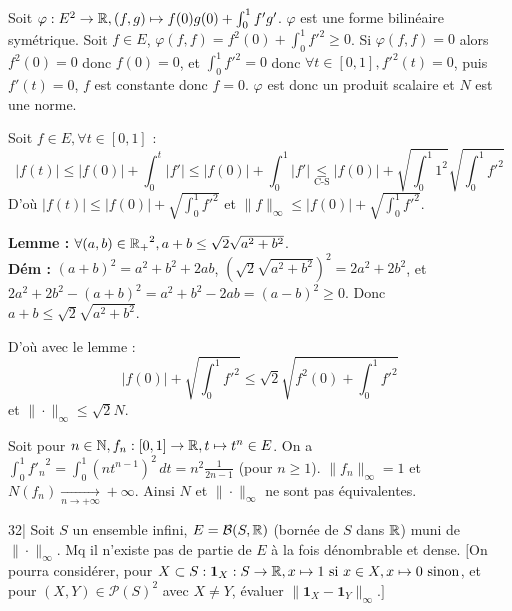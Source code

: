 \begin{solution}
Soit $\varphi : E^2 \to \mathbb R, (f, g) \mapsto f(0)g(0) + \int_0^1 f' g'$. $\varphi$ est une forme bilinéaire symétrique.
Soit $f \in E$, $\varphi(f, f) = f^2(0) + \int_0^1 {f'}^2 \geq 0$.
Si $\varphi(f, f) = 0$ alors $f^2(0) = 0$ donc $f(0) = 0$, et $\int_0^1 {f'}^2 = 0$ donc $\forall t \in [0, 1], {f'}^2(t) = 0$, puis $f'(t) = 0$, $f$ est constante donc $f = 0$.
$\varphi$ est donc un produit scalaire et $N$ est une norme.

Soit $f \in E, \forall t \in [0, 1]$ :
\[ |f(t)| \leq |f(0)| + \int_0^t |f'| \leq |f(0)| + \int_0^1 |f'| \underset{\text{C-S}}{\leq} |f(0)| + \sqrt{\int_0^1 1^2} \sqrt{\int_0^1 {f'}^2} \]
D'où $|f(t)| \leq |f(0)| + \sqrt{\int_0^1 {f'}^2}$ et $\|f\|_\infty \leq |f(0)| + \sqrt{\int_0^1 {f'}^2}$.

\textbf{Lemme :} $\forall (a, b) \in {\mathbb R_+}^2, a + b \leq \sqrt{2}\sqrt{a^2 + b^2}$. \\
\textbf{Dém :} $(a + b)^2 = a^2 + b^2 + 2ab$, $(\sqrt{2}\sqrt{a^2 + b^2})^2 = 2a^2 + 2b^2$, et $2a^2 + 2b^2 - (a + b)^2 = a^2 + b^2 - 2ab = (a - b)^2 \geq 0$. Donc $a + b \leq \sqrt{2}\sqrt{a^2 + b^2}$.

D'où avec le lemme :
\[ |f(0)| + \sqrt{\int_0^1 {f'}^2} \leq \sqrt{2}\sqrt{f^2(0) + \int_0^1 {f'}^2} \]
et $\|\cdot\|_\infty \leq \sqrt{2} N$.

Soit pour $n \in \mathbb N, f_n : [0, 1] \to \mathbb R, t \mapsto t^n \in E$.
On a $\int_0^1 {f'_n}^2 = \int_0^1 (n t^{n-1})^2 \, dt = n^2 \frac{1}{2n - 1}$ (pour $n \geq 1$).
$\|f_n\|_\infty = 1$ et $N(f_n) \xrightarrow[n \to +\infty]{} +\infty$.
Ainsi $N$ et $\|\cdot\|_\infty$ ne sont pas équivalentes.
\end{solution}


\begin{statementbox}
32| Soit $S$ un ensemble infini, $E = \mathcal{B}(S, \mathbb R)$ (bornée de $S$ dans $\mathbb R$) muni de $\|\cdot\|_\infty$.
Mq il n'existe pas de partie de $E$ à la fois dénombrable et dense.
$\big[$On pourra considérer, pour $X \subset S : \mathbf{1}_X : S \to \mathbb R, x \mapsto 1 \text{ si } x \in X, x \mapsto 0 \text{ sinon}$, et pour $(X, Y) \in \mathcal{P}(S)^2$ avec $X \neq Y$, évaluer $\|\mathbf{1}_X - \mathbf{1}_Y\|_\infty$.$\big]$
\end{statementbox}


